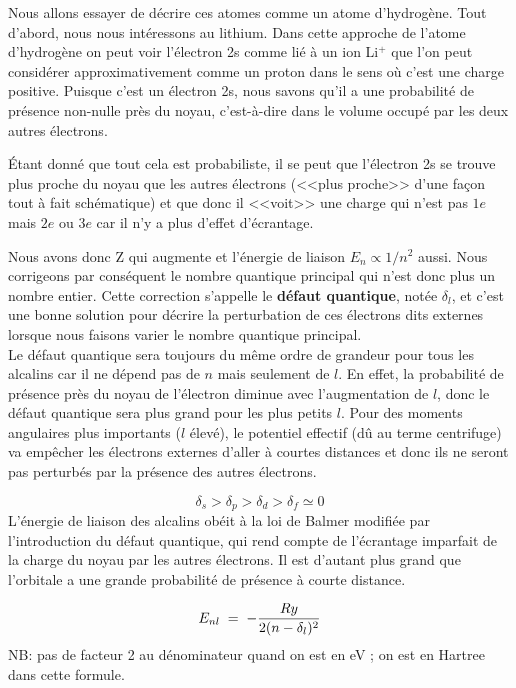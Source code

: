 Nous allons essayer de décrire ces atomes comme un atome d'hydrogène. Tout d'abord, nous nous intéressons au lithium. Dans cette approche de l'atome d'hydrogène on peut voir l'électron 2s comme lié à un ion Li$^{+}$ que l'on peut considérer approximativement comme un proton dans le sens où c'est une charge positive. Puisque c'est un électron 2s, nous savons qu'il a une probabilité de présence non-nulle près du noyau, c'est-à-dire dans le volume occupé par les deux autres électrons.

Étant donné que tout cela est probabiliste, il se peut que l'électron 2s se trouve plus proche du noyau que les autres électrons (<<plus proche>> d'une façon tout à fait schématique) et que donc il <<voit>> une charge qui n'est pas $1e$ mais $2e$ ou $3e$ car il n'y a plus d'effet d'écrantage.

Nous avons donc Z qui augmente et l'énergie de liaison $E_n \propto 1/n^2$ aussi. Nous corrigeons par conséquent le nombre quantique principal qui n'est donc plus un nombre entier. Cette correction s’appelle le \textbf{défaut quantique}, notée $\delta_l$, et c’est une bonne solution pour décrire la perturbation de ces électrons dits externes lorsque nous faisons varier le nombre quantique principal.\\
Le défaut quantique sera toujours du même ordre de grandeur pour tous les alcalins car il ne dépend pas de $n$ mais seulement de $l$. En effet, la probabilité de présence près du noyau de l'électron diminue avec l'augmentation de $l$, donc le défaut quantique sera plus grand pour les plus petits $l$. Pour des moments angulaires plus importants ($l$ élevé), le potentiel effectif (dû au terme centrifuge) va empêcher les électrons externes d’aller à courtes distances et donc ils ne seront pas perturbés par la présence des autres électrons.

\[
    \delta_s>\delta_p>\delta_d>\delta_f\simeq 0
\]
L'énergie de liaison des alcalins obéit à la loi de Balmer modifiée par l’introduction du défaut quantique, qui rend compte de l’écrantage imparfait de la charge du noyau par les autres électrons. Il est d’autant plus grand que l’orbitale a une grande probabilité de présence à courte distance.

\begin{equation}
    E_{nl} \; = \;  - \dfrac{Ry}{2(n-\delta_l)^2}
    \label{eq:def_quant}
\end{equation}
NB: pas de facteur 2 au dénominateur quand on est en eV ; on est en Hartree dans cette formule. \\

